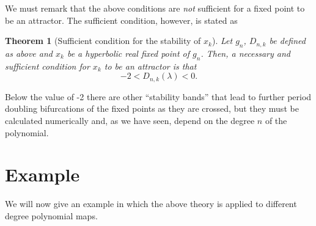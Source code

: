 \documentclass[10pt,twoside,titlepage]{book}
\numberwithin{equation}{chapter}
\numberwithin{figure}{chapter}
\numberwithin{table}{chapter}
\theoremstyle{plain}%
\newtheorem{thm}{Theorem}[chapter]
\theoremstyle{definition}
\theoremstyle{remark}
\begin{document}
We must remark that the above conditions are \emph{not} sufficient for a fixed point to be an attractor. The sufficient condition, however, is stated as

\begin{thm}[Sufficient condition for the stability of $x_k$]
	Let $g_n$, $D_{n,k}$ be defined as above and $x_k$ be a hyperbolic real fixed point of $g_n$. Then, a necessary and sufficient condition for $x_k$ to be an attractor is that
	\begin{equation}
		-2<D_{n,k}(\lambda)<0.
	\end{equation}
\end{thm}

Below the value of -2 there are other ``stability bands'' that lead to further period doubling bifurcations of the fixed points as they are crossed, but they must be calculated numerically and, as we have seen, depend on the degree $n$ of the polynomial.

\section{Example}

We will now give an example in which the above theory is applied to different degree polynomial maps.
\end{document}
